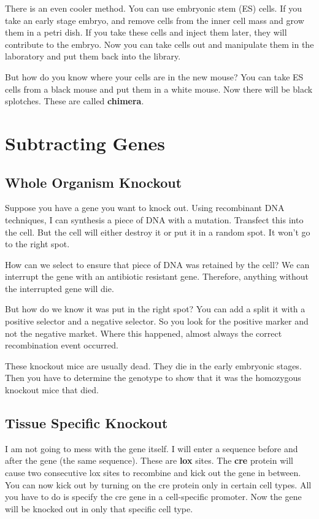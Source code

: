 \documentclass{article}
\begin{document}
There is an even cooler method. You can use embryonic stem (ES) cells. If you
take an early stage embryo, and remove cells from the inner cell mass and grow
them in a petri dish. If you take these cells and inject them later, they will
contribute to the embryo. Now you can take cells out and manipulate them in the
laboratory and put them back into the library.

But how do you know where your cells are in the new mouse? You can take ES cells
from a black mouse and put them in a white mouse. Now there will be black
splotches. These are called \textbf{chimera}.

\section{Subtracting Genes}

\subsection{Whole Organism Knockout}

Suppose you have a gene you want to knock out. Using recombinant DNA techniques,
I can synthesis a piece of DNA with a mutation. Transfect this into the cell.
But the cell will either destroy it or put it in a random spot. It won't go to
the right spot. 

How can we select to ensure that piece of DNA was retained by the cell? We can
interrupt the gene with an antibiotic resistant gene. Therefore, anything
without the interrupted gene will die.

But how do we know it was put in the right spot? You can add a split it with a
positive selector and a negative selector. So you look for the positive marker
and not the negative market. Where this happened, almost always the correct
recombination event occurred.

These knockout mice are usually dead. They die in the early embryonic stages.
Then you have to determine the genotype to show that it was the homozygous
knockout mice that died.

\subsection{Tissue Specific Knockout}

I am not going to mess with the gene itself. I will enter a sequence before and
after the gene (the same sequence). These are \textbf{lox} sites. The
\textbf{cre} protein will cause two consecutive lox sites to recombine and kick
out the gene in between. You can now kick out by turning on the cre protein only
in certain cell types. All you have to do is specify the cre gene in a
cell-specific promoter. Now the gene will be knocked out in only that specific
cell type.
\end{document}
